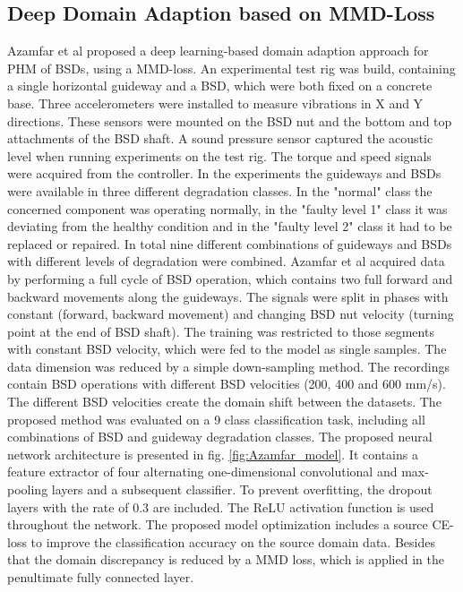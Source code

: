 \subsection{Deep Domain Adaption based on MMD-Loss}
Azamfar et al \cite{AZAMFAR2020103932} proposed a deep learning-based domain adaption approach for PHM of BSDs, using a MMD-loss. An experimental test rig was build, containing a single horizontal guideway and a BSD, which were both fixed on a concrete base. Three accelerometers were installed to measure vibrations in X and Y directions. These sensors were mounted on the BSD nut and the bottom and top attachments of the BSD shaft. A sound pressure sensor captured the acoustic level when running experiments on the test rig. The torque and speed signals were acquired from the controller. In the experiments the guideways and BSDs were available in three different degradation classes. In the "normal" class the concerned component was operating normally, in the "faulty level 1" class it was deviating from the healthy condition and in the "faulty level 2" class it had to be replaced or repaired. In total nine different combinations of guideways and BSDs with different levels of degradation were combined. Azamfar et al acquired data by performing a full cycle of BSD operation, which contains two full forward and backward movements along the guideways. The signals were split in phases with constant (forward, backward movement) and changing BSD nut velocity (turning point at the end of BSD shaft). The training was restricted to those segments with constant BSD velocity, which were fed to the model as single samples. The data dimension was reduced by a simple down-sampling method. The recordings contain BSD operations with different BSD velocities (200, 400 and 600 mm/s). The different BSD velocities create the domain shift between the datasets. The proposed method was evaluated on a 9 class classification task, including all combinations of BSD and guideway degradation classes. The proposed neural network architecture is presented in fig. \ref{fig:Azamfar_model}. It contains a feature extractor of four alternating one-dimensional convolutional and max-pooling layers and a subsequent classifier. To prevent overfitting, the dropout layers with the rate of 0.3 are included. The ReLU activation function is used throughout the network. The proposed model optimization includes a source CE-loss to improve the classification accuracy on the source domain data. Besides that the domain discrepancy is reduced by a MMD loss, which is applied in the penultimate fully connected layer. 

